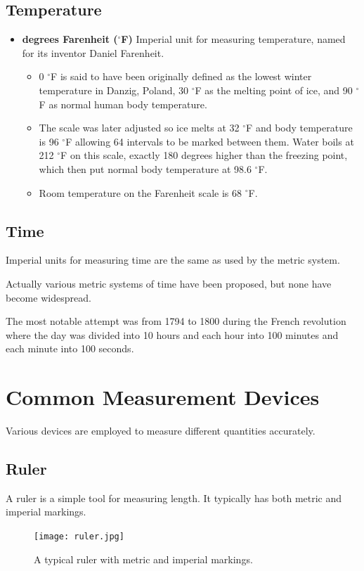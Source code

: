 \documentclass{article}
\begin{document}
\subsection*{Temperature}
\begin{itemize}
\item \textbf{degrees Farenheit ($^\circ$F)} Imperial unit for measuring temperature, named for its inventor Daniel Farenheit.
  \begin{itemize}
  \item 0 $^\circ$F is said to have been originally defined as the lowest winter temperature in Danzig, Poland, 30 $^\circ$F as the melting point of ice, and 90 $^\circ$F as normal human body temperature.
  \item The scale was later adjusted so ice melts at 32 $^\circ$F and body temperature is 96 $^\circ$F allowing 64 intervals to be marked between them. Water boils at 212 $^\circ$F on this scale, exactly 180 degrees higher than the freezing point, which then put normal body temperature at 98.6 $^\circ$F.
  \item Room temperature on the Farenheit scale is 68 $^\circ$F.
  \end{itemize}
\end{itemize}

\subsection*{Time}
Imperial units for measuring time are the same as used by the metric system.

Actually various metric systems of time have been proposed, but none have become widespread.

The most notable attempt was from 1794 to 1800 during the French revolution where the day was divided into 10 hours and each hour into 100 minutes and each minute into 100 seconds.

\section*{Common Measurement Devices}
Various devices are employed to measure different quantities accurately.

\subsection*{Ruler}
A ruler is a simple tool for measuring length. It typically has both metric and imperial markings.

\begin{figure}[h]
    \centering
    \texttt{[image: ruler.jpg]}
    \caption{A typical ruler with metric and imperial markings.}
\end{figure}
\end{document}
